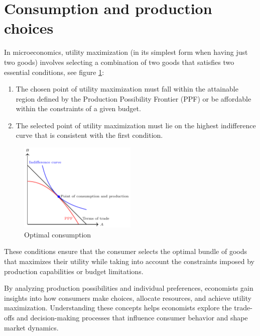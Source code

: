 \documentclass[
  12pt,
  oneside]{book}
\providecommand{\tightlist}{%
  \setlength{\itemsep}{0pt}\setlength{\parskip}{0pt}}
\theoremstyle{definition}
\theoremstyle{definition}
\theoremstyle{definition}
\theoremstyle{definition}
\theoremstyle{remark}
\begin{document}
\section{Consumption and production choices}\label{consumption-and-production-choices}

In microeconomics, utility maximization (in its simplest form when having just two goods) involves selecting a combination of two goods that satisfies two essential conditions, see figure \ref{fig:optimalconsumption}:

\begin{enumerate}
\def\labelenumi{\arabic{enumi}.}
\tightlist
\item
  The chosen point of utility maximization must fall within the attainable region defined by the Production Possibility Frontier (PPF) or be affordable within the constraints of a given budget.
\item
  The selected point of utility maximization must lie on the highest indifference curve that is consistent with the first condition.
\end{enumerate}

\begin{figure}
\centering
\includegraphics[width=0.5\textwidth,height=\textheight]{fig/optimalconsumption.png}
\caption{\label{fig:optimalconsumption} Optimal consumption}
\end{figure}

These conditions ensure that the consumer selects the optimal bundle of goods that maximizes their utility while taking into account the constraints imposed by production capabilities or budget limitations.

By analyzing production possibilities and individual preferences, economists gain insights into how consumers make choices, allocate resources, and achieve utility maximization. Understanding these concepts helps economists explore the trade-offs and decision-making processes that influence consumer behavior and shape market dynamics.
\end{document}
